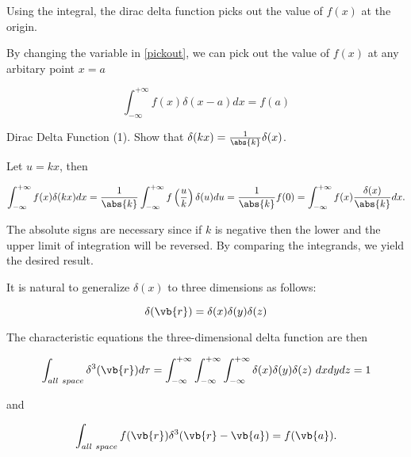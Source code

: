 \documentclass[english,a4paper,12pt]{report}
\begin{document}
Using the integral, the dirac delta function picks out the value of \(f(x)\) at the origin.
	
By changing the variable in \cref{pickout}, we can pick out the value of \(f(x)\) at any arbitary point \(x = a\)
	
\begin{equation} 
	\int_{-\infty}^{+\infty} f(x) \delta(x-a) dx = f(a) 
\end{equation}
	
\example
{Dirac Delta Function (1).}
{Show that \(\delta(kx) = \frac{1}{\abs{k}}\delta(x)\).}
{Let \(u = kx\), then 
			
\begin{equation} 
	\int_{-\infty}^{+\infty} f(x) \delta(kx) dx = \frac{1}{\abs{k} }  \int_{-\infty}^{+\infty} f\left(\frac{u}{k}\right) \delta(u) du = \frac{1}{\abs{k}} f(0) = \int_{-\infty}^{+\infty} f(x) \frac{\delta(x)}{\abs{k}} dx.
\end{equation}
			
The absolute signs are necessary since if \(k\) is negative then the lower and the upper limit of integration will be reversed. By comparing the integrands, we yield the desired result.}	
		


It is natural to generalize \(\delta(x)\) to three dimensions as follows:
	
\begin{equation} 
	\delta(\vb{r}) = \delta(x)\delta(y)\delta(z) 
\end{equation}
	
The characteristic equations the three-dimensional delta function are then 
	

\begin{equation} 
	\int_{all~space} \delta^3(\vb{r})
	d\tau = \int_{-\infty}^{+\infty}\int_{-\infty}^{+\infty}\int_{-\infty}^{+\infty} \delta(x)\delta(y)\delta(z) ~dxdydz = 1 
\end{equation}
	
and
	
\begin{equation} 
	\int_{all~space} f(\vb{r}) \delta^3(\vb{r} - \vb{a}) = f(\vb{a}). 
\end{equation} 
	
\end{document}
